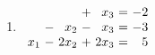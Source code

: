 \documentclass{article}
\begin{document}
\begin{enumerate}
\item 
$\begin{array}{r@{\ }c@{\ }r@{\ }c@{\ }r@{\ }c@{\ }r@{\ }c@{\ }}
&&& +& x_{3}&=&-2 \\
 & -& x_{2}& -& x_{3}&=&-3 \\
 x_{1}& -& 2x_{2}& +& 2x_{3}&=&5 \\
 \end{array}$
\end{enumerate}
\end{document}
